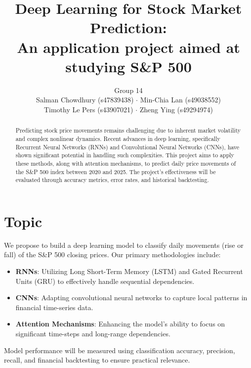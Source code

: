 \documentclass[a4paper,11pt]{article} %
\begin{document}
\title{Deep Learning for Stock Market Prediction:\\ An application project aimed at studying S\&P 500 }
\author{Group 14 \\
Salman Chowdhury (s47839438) $\cdot$
Min-Chia Lan (s49038552)\\
Timothy Le Pers (s43907021) $\cdot$
Zheng Ying (s49294974)}

\date{}
\maketitle

\begin{abstract}
Predicting stock price movements remains challenging due to inherent market volatility and complex nonlinear dynamics. Recent advances in deep learning, specifically Recurrent Neural Networks (RNNs) and Convolutional Neural Networks (CNNs), have shown significant potential in handling such complexities. This project aims to apply these methods, along with attention mechanisms, to predict daily price movements of the S\&P 500 index between 2020 and 2025. The project's effectiveness will be evaluated through accuracy metrics, error rates, and historical backtesting. 
\end{abstract}

\section{Topic}

We propose to build a deep learning model to classify daily movements (rise or fall) of the S\&P 500 closing prices. Our primary methodologies include: 

\begin{itemize}
    \item \textbf{RNNs}: Utilizing Long Short-Term Memory (LSTM) and Gated Recurrent Units (GRU) to effectively handle sequential dependencies. 
    \item \textbf{CNNs}: Adapting convolutional neural networks to capture local patterns in financial time-series data. 
    \item \textbf{Attention Mechanisms}: Enhancing the model's ability to focus on significant time-steps and long-range dependencies. 
\end{itemize}

\noindent Model performance will be measured using classification accuracy, precision, recall, and financial backtesting to ensure practical relevance. 
\end{document}
